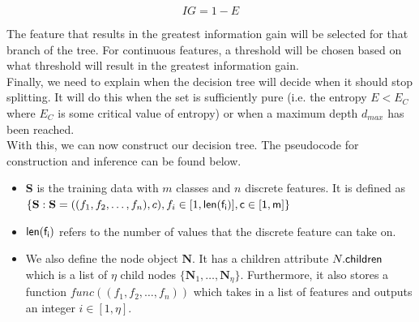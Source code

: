 $$IG = 1 - E$$

The feature that results in the greatest information gain will be selected for that branch of the tree. For continuous features, a threshold will be chosen based on what threshold will result in the greatest information gain. \\

Finally, we need to explain when the decision tree will decide when it should stop splitting. It will do this when the set is sufficiently pure (i.e. the entropy $E < E_C$ where $E_C$ is some critical value of entropy) or when a maximum depth $d_{max}$ has been reached. \\

 With this, we can now construct our decision tree. The pseudocode for construction and inference can be found below. 

\begin{itemize}
	\item \textbf{S} is the training data with $m$ classes and $n$ discrete features. It is defined as $\{\textbf{S} : \textbf{S} = {((f_1,f_2,\dots,f_n),c),f_i\in[1,\sf{len}(f_i)],c\in [1,m]}\}$\\
	\item $\sf{len}(f_i)$ refers to the number of values that the discrete feature can take on.\\
	\item We also define the node object $\textbf{N}$. It has a children attribute $N.\sf{children}$ which is a list of $\eta$ child nodes $\{\textbf{N}_1,\dots,\textbf{N}_\eta\}$. Furthermore, it also stores a function $func((f_1,f_2,\dots,f_n))$ which takes in a list of features and outputs an integer $i\in[1,\eta]$.
	
\end{itemize}

